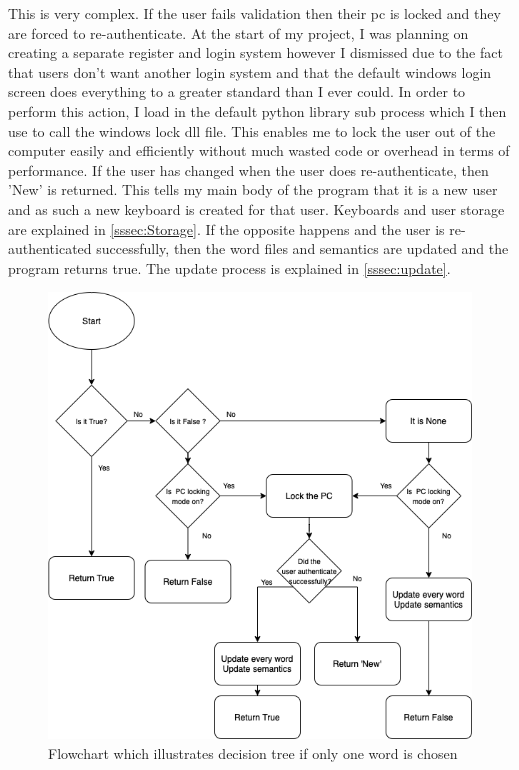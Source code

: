\documentclass[10pt,a4paper]{report}
\begin{document}
This is very complex. If the user fails validation then their pc is locked and they are forced to re-authenticate. At the start of my project, I was planning on creating a separate register and login system however I dismissed due to the fact that users don't want another login system and that the default windows login screen does everything to a greater standard than I ever could. In order to perform this action, I load in the default python library sub process \cite{subprocess} which I then use to call the windows lock dll file. This enables me to lock the user out of the computer easily and efficiently without much wasted code or overhead in terms of performance. If the user has changed when the user does re-authenticate, then 'New' is returned. This tells my main body of the program that it is a new user and as such a new keyboard is created for that user. Keyboards and user storage are explained in \ref{sssec:Storage}. If the opposite happens and the user is re-authenticated successfully, then the word files and semantics are updated and the program returns true. The update process is explained in \ref{sssec:update}.

\begin{figure}[h]
	\centering
	\includegraphics[scale=0.4]{IfLen1}
	\caption{Flowchart which illustrates decision tree if only one word is chosen}
	\label{fig:If1}
\end{figure}
\end{document}
